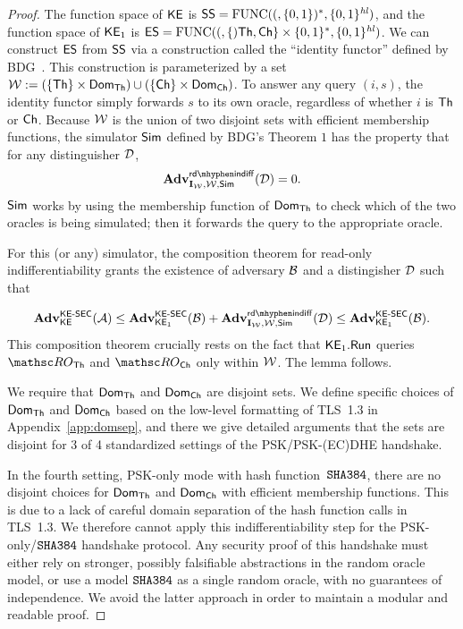 \begin{proof}
	The function space of $\mathsf{KE}$ is $\mathsf{SS} = \mathrm{FUNC}((,\{0,1\})^*, \{0,1\}^{\mathit{hl}})$, and the function space of $\mathsf{KE}_1$ is $\mathsf{ES} = \mathrm{FUNC}((,\{)\mathsf{Th}, \mathsf{Ch}\} \times \{0,1\}^*, \{0,1\}^{\mathit{hl}})$. 
	We can construct $\mathsf{ES}$ from $\mathsf{SS}$ via a construction called the ``identity functor'' defined by BDG~\cite{EC:BelDavGun20}.
	This construction is parameterized by a set ${\cal W}:= (\{\mathsf{Th} \}\times \mathsf{Dom}_{\mathsf{Th}}) \cup (\{\mathsf{Ch} \}\times \mathsf{Dom}_{\mathsf{Ch}})$.
	To answer any query $(i, s)$, the identity functor simply forwards $s$ to its own oracle, regardless of whether $i$ is $\mathsf{Th}$ or $\mathsf{Ch}$.
	Because ${\cal W}$ is the union of two disjoint sets with efficient membership functions, the simulator $\mathsf{Sim}$ defined by BDG's Theorem $1$ has the property that for any distinguisher $\mathcal{D}$,
	\[\genAdv{\rdindiff}{\construct{I}_\workDom, \workDom, \Sim}{\advD} = 0.\]
	$\mathsf{Sim}$ works by using the membership function of $\mathsf{Dom}_{\mathsf{Th}}$ to check which of the two oracles is being simulated; then it forwards the query to the appropriate oracle.
	
	For this (or any) simulator, the composition theorem for read-only indifferentiability grants the existence of adversary $\mathcal{B}$ and a distingisher $\mathcal{D}$ such that
	
	\[
	\genAdv{\KESEC}{\KE}{\advA} \leq \genAdv{\KESEC}{\KE_1}{\advB} + \genAdv{\rdindiff}{\construct{I}_\workDom, \workDom, \Sim}{\advD}
	\leq \genAdv{\KESEC}{\KE_1}{\advB}.
	\]
	This composition theorem crucially rests on the fact that $\mathsf{KE}_1.\mathsf{Run}$ queries $\ROthash$ and $\ROchash$ only within ${\cal W}$. The lemma follows.
	
	We require that $\mathsf{Dom}_{\mathsf{Th}}$ and $\mathsf{Dom}_{\mathsf{Ch}}$ are disjoint sets. We define specific choices of $\mathsf{Dom}_{\mathsf{Th}}$ and $\mathsf{Dom}_{\mathsf{Ch}}$ based on the low-level formatting of TLS~1.3 in Appendix~\ref{app:domsep}, and there we give detailed arguments that the sets are disjoint for 3 of 4 standardized settings of the PSK/PSK-(EC)DHE handshake. 
	
	In the fourth setting, PSK-only mode with hash function~$\texttt{SHA{384}}$, there are no disjoint choices for $\mathsf{Dom}_{\mathsf{Th}}$ and $\mathsf{Dom}_{\mathsf{Ch}}$ with efficient membership functions.
	This is due to a lack of careful domain separation of the hash function calls in TLS~1.3. 
	We therefore cannot apply this indifferentiability step for the PSK-only/$\texttt{SHA{384}}$ handshake protocol.
	Any security proof of this handshake must either rely on stronger, possibly falsifiable abstractions in the random oracle model, or use a model $\texttt{SHA{384}}$ as a single random oracle, with no guarantees of independence.
	We avoid the latter approach in order to maintain a modular and readable proof. 
	

\end{proof}
